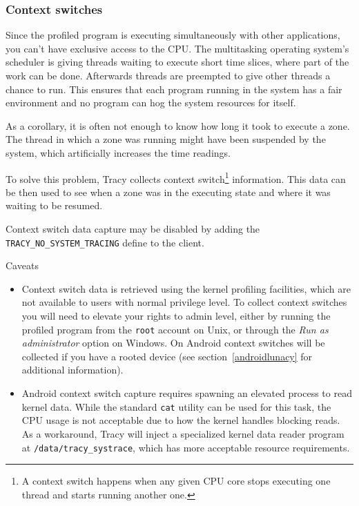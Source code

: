 \documentclass[hidelinks,titlepage,a4paper]{article}
\begin{document}
\subsubsection{Context switches}
\label{contextswitches}

Since the profiled program is executing simultaneously with other applications, you can't have exclusive access to the CPU. The multitasking operating system's scheduler is giving threads waiting to execute short time slices, where part of the work can be done. Afterwards threads are preempted to give other threads a chance to run. This ensures that each program running in the system has a fair environment and no program can hog the system resources for itself.

As a corollary, it is often not enough to know how long it took to execute a zone. The thread in which a zone was running might have been suspended by the system, which artificially increases the time readings.

To solve this problem, Tracy collects context switch\footnote{A context switch happens when any given CPU core stops executing one thread and starts running another one.} information. This data can be then used to see when a zone was in the executing state and where it was waiting to be resumed.

Context switch data capture may be disabled by adding the \texttt{TRACY\_NO\_SYSTEM\_TRACING} define to the client.

\begin{bclogo}[
noborder=true,
couleur=black!5,
logo=\bcattention
]{Caveats}
\begin{itemize}
\item Context switch data is retrieved using the kernel profiling facilities, which are not available to users with normal privilege level. To collect context switches you will need to elevate your rights to admin level, either by running the profiled program from the \texttt{root} account on Unix, or through the \emph{Run as administrator} option on Windows. On Android context switches will be collected if you have a rooted device (see section~\ref{androidlunacy} for additional information).
\item Android context switch capture requires spawning an elevated process to read kernel data. While the standard \texttt{cat} utility can be used for this task, the CPU usage is not acceptable due to how the kernel handles blocking reads. As a workaround, Tracy will inject a specialized kernel data reader program at \texttt{/data/tracy\_systrace}, which has more acceptable resource requirements.
\end{itemize}
\end{bclogo}
\end{document}
